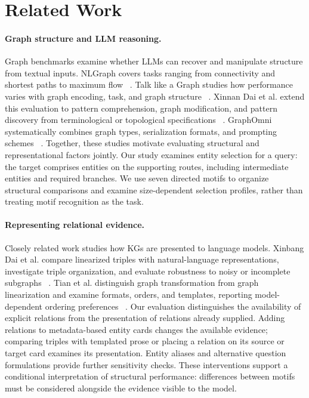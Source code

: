 \section{Related Work}
\label{sec:related-v2}

\paragraph{Graph structure and LLM reasoning.}
Graph benchmarks examine whether LLMs can recover and manipulate structure from textual inputs. NLGraph covers tasks ranging from connectivity and shortest paths to maximum flow ~\cite{wang2023nlgraph}. Talk like a Graph studies how performance varies with graph encoding, task, and graph structure ~\cite{fatemi2024talklikegraph}. Xinnan Dai et al. extend this evaluation to pattern comprehension, graph modification, and pattern discovery from terminological or topological specifications ~\cite{dai2025graphpatterns}. GraphOmni systematically combines graph types, serialization formats, and prompting schemes ~\cite{xu2026graphomni}. Together, these studies motivate evaluating structural and representational factors jointly. Our study examines entity selection for a query: the target comprises entities on the supporting routes, including intermediate entities and required branches. We use seven directed motifs to organize structural comparisons and examine size-dependent selection profiles, rather than treating motif recognition as the task.

\paragraph{Representing relational evidence.}
Closely related work studies how KGs are presented to language models. Xinbang Dai et al. compare linearized triples with natural-language representations, investigate triple organization, and evaluate robustness to noisy or incomplete subgraphs ~\cite{dai2024kgunderstanding}. Tian et al. distinguish graph transformation from graph linearization and examine formats, orders, and templates, reporting model-dependent ordering preferences ~\cite{tian2025alignment}. Our evaluation distinguishes the availability of explicit relations from the presentation of relations already supplied. Adding relations to metadata-based entity cards changes the available evidence; comparing triples with templated prose or placing a relation on its source or target card examines its presentation. Entity aliases and alternative question formulations provide further sensitivity checks. These interventions support a conditional interpretation of structural performance: differences between motifs must be considered alongside the evidence visible to the model.

